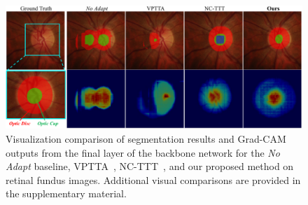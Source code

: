 \begin{figure}[!t]
    \centering
\includegraphics[width=0.999\linewidth]{Figures/visual_compare.pdf}
    \caption{Visualization comparison of segmentation results and Grad-CAM outputs from the final layer of the backbone network for the \textit{No Adapt} baseline, VPTTA~\cite{chen2024each}, NC-TTT~\cite{osowiechi2024nc}, and our proposed method on retinal fundus images. Additional visual comparisons are provided in the supplementary material.}
     \vspace{-0.5cm}
    \label{fig:visual}
\end{figure}